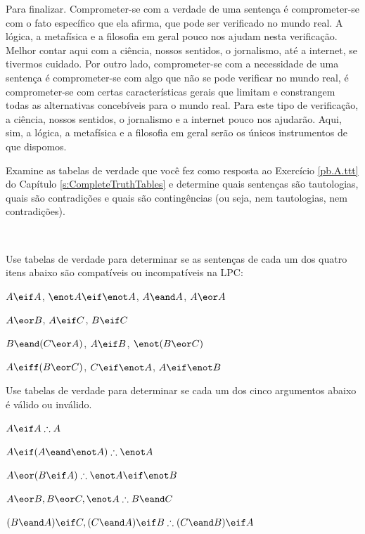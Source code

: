 Para finalizar.
Comprometer-se com a verdade de uma sentença é comprometer-se com o fato específico que ela afirma, que pode ser verificado no mundo real.
A lógica, a metafísica e a filosofia em geral pouco nos ajudam nesta verificação.
Melhor contar aqui com a ciência, nossos sentidos, o jornalismo, até a internet, se tivermos cuidado.
Por outro lado, comprometer-se com a necessidade de uma sentença é comprometer-se com algo que não se pode verificar no mundo real, é comprometer-se com certas características gerais que limitam e constrangem todas as alternativas concebíveis para o mundo real.
Para este tipo de verificação, a ciência, nossos sentidos, o jornalismo e a internet pouco nos ajudarão.
Aqui, sim, a lógica, a metafísica e a filosofia em geral serão os únicos instrumentos de que dispomos.


\practiceproblems
\problempart
Examine as tabelas de verdade que você fez como resposta ao Exercício \ref{pb.A.ttt} do Capítulo \ref{s:CompleteTruthTables} e determine quais sentenças são tautologias, quais são contradições e quais são contingências (ou seja, nem tautologias, nem contradições).
\solutions

\

\problempart
\label{pr.TT.satisfiable}
Use tabelas de verdade para determinar se as sentenças de cada um dos quatro itens abaixo são compatíveis ou incompatíveis na LPC:
\begin{earg}
\item $A\eif A$, $\enot A \eif \enot A$, $A\eand A$, $A\eor A$ %
\item $A\eor B$, $A\eif C$, $B\eif C$ %
\item $B\eand(C\eor A)$, $A\eif B$, $\enot(B\eor C)$  %
\item $A\eiff(B\eor C)$, $C\eif \enot A$, $A\eif \enot B$ %
\end{earg}


\solutions
\problempart
\label{pr.TT.valid}
Use tabelas de verdade para determinar se cada um dos cinco argumentos abaixo é válido ou inválido.
\begin{earg}
\item $A\eif A \therefore A$ %
\item $A\eif(A\eand\enot A) \therefore \enot A$ %
\item $A\eor(B\eif A) \therefore \enot A \eif \enot B$ %
\item $A\eor B, B\eor C, \enot A \therefore B \eand C$ %
\item $(B\eand A)\eif C, (C\eand A)\eif B \therefore (C\eand B)\eif A$ %
\end{earg}

